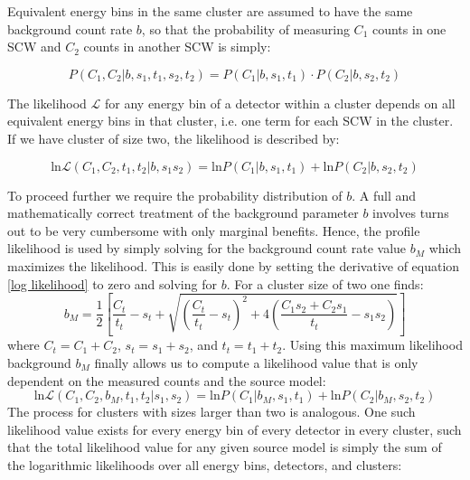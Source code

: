 \documentclass{report}
\begin{document}
Equivalent energy bins in the same cluster are assumed to have the same background count rate $b$, so that the probability of measuring $C_1$ counts in one SCW and $C_2$ counts in another SCW is simply:

\begin{equation} \label{eq probs}
    P(C_1, C_2 \vert b, s_1, t_1, s_2, t_2) = P(C_1 \vert b, s_1, t_1) \cdot P(C_2 \vert b, s_2, t_2)
\end{equation}

The likelihood $\mathcal{L}$ for any energy bin of a detector within a cluster depends on all equivalent energy bins in that cluster, i.e. one term for each SCW in the cluster. If we have cluster of size two, the likelihood is described by:

\begin{equation}\label{log likelihood}
    \text{ln}\mathcal{L}(C_1, C_2, t_1, t_2\vert b, s_1 s_2) = \text{ln}P(C_1 \vert b, s_1, t_1) + \text{ln}P(C_2 \vert b, s_2, t_2)
\end{equation}

To proceed further we require the probability distribution of $b$. A full and mathematically correct treatment of the background parameter $b$ involves  turns out to be very cumbersome with only marginal benefits. Hence, the profile likelihood is used by simply solving for the background count rate value $b_M$ which maximizes the likelihood. This is easily done by setting the derivative of equation \ref{log likelihood} to zero and solving for $b$. For a cluster size of two one finds:
\begin{equation} \label{eq: max lik back}
    b_M = \frac{1}{2} \left[ \frac{C_t}{t_t} - s_t + \sqrt{\left( \frac{C_t}{t_t} - s_t\right)^2 + 4 \left( \frac{C_1s_2+C_2s_1}{t_t}-s_1s_2\right)}\right]
\end{equation}
where $C_t=C_1+C_2$, $s_t=s_1+s_2$, and $t_t=t_1+t_2$. Using this maximum likelihood background $b_M$ finally allows us to compute a likelihood value that is only dependent on the measured counts and the source model:
\begin{equation} \label{log_likelihood final}
    \text{ln}\mathcal{L}(C_1, C_2, b_M, t_1, t_2 \vert s_1, s_2) = \text{ln}P(C_1 \vert b_M, s_1, t_1) + \text{ln}P(C_2 \vert b_M, s_2, t_2)
\end{equation}
The process for clusters with sizes larger than two is analogous. One such likelihood value exists for every energy bin of every detector in every cluster, such that the total likelihood value for any given source model is simply the sum of the logarithmic likelihoods over all energy bins, detectors, and clusters:
\end{document}
